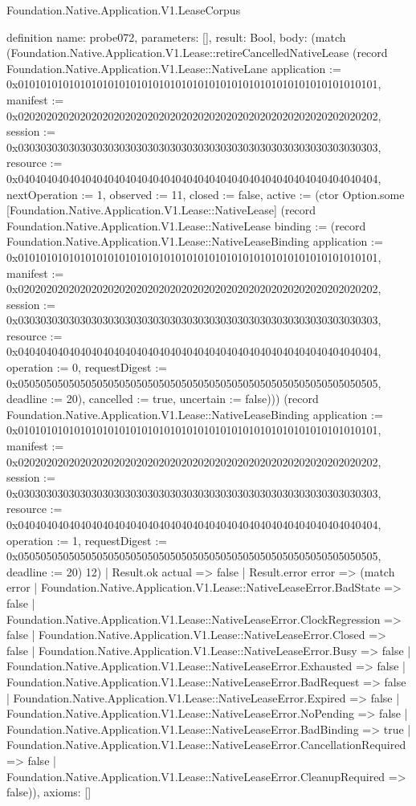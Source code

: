 \begin{lexlean}{Foundation.Native.Application.V1.LeaseCorpus}
\begin{semanticmodule}
definition{
  name: probe072,
  parameters: [],
  result: Bool,
  body: (match (Foundation.Native.Application.V1.Lease::retireCancelledNativeLease (record Foundation.Native.Application.V1.Lease::NativeLane {application := 0x0101010101010101010101010101010101010101010101010101010101010101, manifest := 0x0202020202020202020202020202020202020202020202020202020202020202, session := 0x0303030303030303030303030303030303030303030303030303030303030303, resource := 0x0404040404040404040404040404040404040404040404040404040404040404, nextOperation := 1, observed := 11, closed := false, active := (ctor Option.some [Foundation.Native.Application.V1.Lease::NativeLease] (record Foundation.Native.Application.V1.Lease::NativeLease {binding := (record Foundation.Native.Application.V1.Lease::NativeLeaseBinding {application := 0x0101010101010101010101010101010101010101010101010101010101010101, manifest := 0x0202020202020202020202020202020202020202020202020202020202020202, session := 0x0303030303030303030303030303030303030303030303030303030303030303, resource := 0x0404040404040404040404040404040404040404040404040404040404040404, operation := 0, requestDigest := 0x0505050505050505050505050505050505050505050505050505050505050505, deadline := 20}), cancelled := true, uncertain := false}))}) (record Foundation.Native.Application.V1.Lease::NativeLeaseBinding {application := 0x0101010101010101010101010101010101010101010101010101010101010101, manifest := 0x0202020202020202020202020202020202020202020202020202020202020202, session := 0x0303030303030303030303030303030303030303030303030303030303030303, resource := 0x0404040404040404040404040404040404040404040404040404040404040404, operation := 1, requestDigest := 0x0505050505050505050505050505050505050505050505050505050505050505, deadline := 20}) 12)
    | Result.ok actual => false
    | Result.error error => (match error
      | Foundation.Native.Application.V1.Lease::NativeLeaseError.BadState => false
      | Foundation.Native.Application.V1.Lease::NativeLeaseError.ClockRegression => false
      | Foundation.Native.Application.V1.Lease::NativeLeaseError.Closed => false
      | Foundation.Native.Application.V1.Lease::NativeLeaseError.Busy => false
      | Foundation.Native.Application.V1.Lease::NativeLeaseError.Exhausted => false
      | Foundation.Native.Application.V1.Lease::NativeLeaseError.BadRequest => false
      | Foundation.Native.Application.V1.Lease::NativeLeaseError.Expired => false
      | Foundation.Native.Application.V1.Lease::NativeLeaseError.NoPending => false
      | Foundation.Native.Application.V1.Lease::NativeLeaseError.BadBinding => true
      | Foundation.Native.Application.V1.Lease::NativeLeaseError.CancellationRequired => false
      | Foundation.Native.Application.V1.Lease::NativeLeaseError.CleanupRequired => false)),
  axioms: []
}


\end{semanticmodule}
\end{lexlean}
